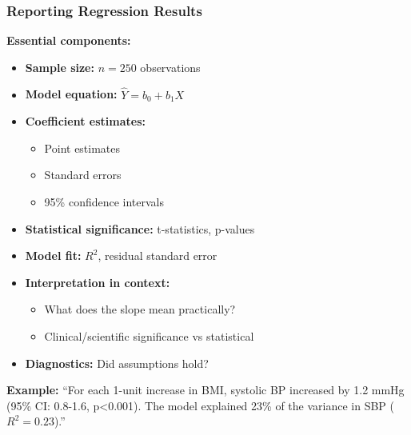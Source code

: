 \documentclass{beamer}
\begin{document}
\begin{frame}
\frametitle{Reporting Regression Results}
\textbf{Essential components:}

\vspace{0.3cm}
\begin{itemize}
\item \textbf{Sample size:} $n = 250$ observations
\item \textbf{Model equation:} $\hat{Y} = b_0 + b_1 X$
\item \textbf{Coefficient estimates:}
  \begin{itemize}
  \item Point estimates
  \item Standard errors
  \item 95\% confidence intervals
  \end{itemize}
\item \textbf{Statistical significance:} t-statistics, p-values
\item \textbf{Model fit:} $R^2$, residual standard error
\item \textbf{Interpretation in context:}
  \begin{itemize}
  \item What does the slope mean practically?
  \item Clinical/scientific significance vs statistical
  \end{itemize}
\item \textbf{Diagnostics:} Did assumptions hold?
\end{itemize}

\vspace{0.3cm}
\textbf{Example:} ``For each 1-unit increase in BMI, systolic BP increased by 1.2 mmHg (95\% CI: 0.8-1.6, p<0.001). The model explained 23\% of the variance in SBP ($R^2=0.23$).''
\end{frame}
\end{document}
